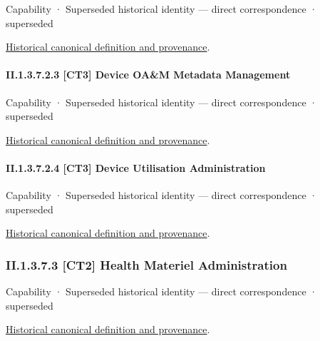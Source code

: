 \label{element:9225f083d3474715a75af2a827a4016d}
{\small Capability · Superseded historical identity — direct correspondence · superseded}\par
\href{../../../../continuum/strategy/capability/9225f083d3474715a75af2a827a4016d.md}{Historical canonical definition and provenance}.\par
\paragraph*{II.1.3.7.2.3 [CT3] Device OA\&M Metadata Management}
\label{navigation:II.1.3.7.2.3}

\label{element:a398c72bef094dee96c96d97994449fb}
{\small Capability · Superseded historical identity — direct correspondence · superseded}\par
\href{../../../../continuum/strategy/capability/a398c72bef094dee96c96d97994449fb.md}{Historical canonical definition and provenance}.\par
\paragraph*{II.1.3.7.2.4 [CT3] Device Utilisation Administration}
\label{navigation:II.1.3.7.2.4}

\label{element:a0af0a86667d48f4ab95ed2920e878cb}
{\small Capability · Superseded historical identity — direct correspondence · superseded}\par
\href{../../../../continuum/strategy/capability/a0af0a86667d48f4ab95ed2920e878cb.md}{Historical canonical definition and provenance}.\par
\subsubsection*{II.1.3.7.3 [CT2] Health Materiel Administration}
\label{navigation:II.1.3.7.3}

\label{element:4952f86078c54a8d898ac992e6f4f577}
{\small Capability · Superseded historical identity — direct correspondence · superseded}\par
\href{../../../../continuum/strategy/capability/4952f86078c54a8d898ac992e6f4f577.md}{Historical canonical definition and provenance}.\par
